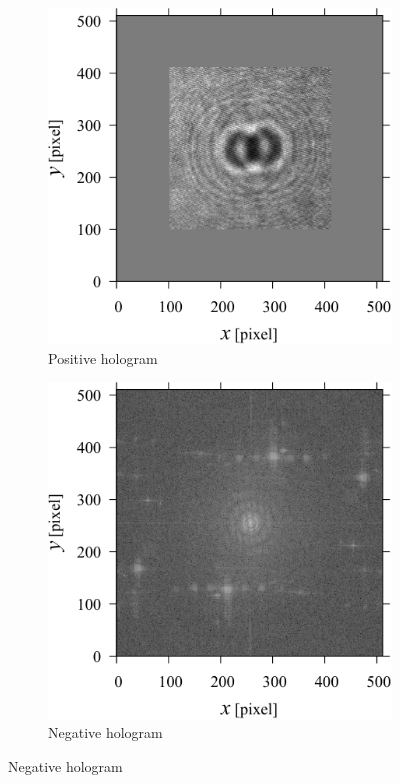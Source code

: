 \begin{figure}[H]
    \centering
    \begin{subfigure}[t]{0.45\linewidth}
        \includegraphics[width=\linewidth]{./Figure/7_Appendix/data/holoexp.pdf}
        \caption{Positive hologram}
        \label{fig:appendixBresult:expholo}
    \end{subfigure}
    \hfill
    \begin{subfigure}[t]{0.45\linewidth}
        \includegraphics[width=\linewidth]{./Figure/7_Appendix/data/fftexp.pdf}
        \caption{Negative hologram}
        \label{fig:appendixBresult:expfft}
    \end{subfigure}


\end{figure}
